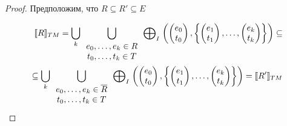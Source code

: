 \begin{enumerate}
\begin{proof}

Предположим, что $R \subseteq R' \subseteq E$

\begin{align*}
[\![ R ]\!]_{TM} = \bigcup_{k}{
\bigcup_{
\begin{array}{c}
e_0, \dots,e_k \in R \\
t_0, \dots,t_k \in T
\end{array}
}{ 
\mathrel{\bigoplus}_I
\left(
\begin{pmatrix}
e_0 \\
t_0 
\end{pmatrix},
\left\{
\begin{pmatrix}
e_1 \\
t_1 
\end{pmatrix},
\dots ,
\begin{pmatrix}
e_k \\
t_k 
\end{pmatrix}
\right\}
\right)
}
} \subseteq  \\
\subseteq \bigcup_{k}{
\bigcup_{
\begin{array}{c}
e_0, \dots,e_k \in \overline{R} \\
t_0, \dots,t_k \in T
\end{array}}{
\mathrel{\bigoplus}_I
\left(
\begin{pmatrix}
e_0 \\
t_0 
\end{pmatrix},
\left\{
\begin{pmatrix}
e_1 \\
t_1 
\end{pmatrix},
\dots ,
\begin{pmatrix}
e_k \\
t_k 
\end{pmatrix}
\right\}
\right) 
}
} = [\![ R' ]\!]_{TM} 
\end{align*}


\end{proof}
\end{enumerate}
